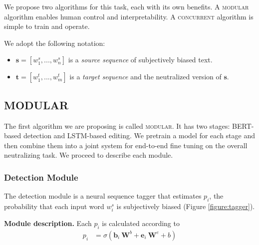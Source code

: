 We propose two algorithms for this task, each with its own benefits.  A \textsc{modular} algorithm enables human control and interpretability. A \textsc{concurrent} algorithm is simple to train and operate. 


We adopt the following notation:
\vspace*{-5pt}\begin{itemize}
    \item $\mathbf{s} = [w^s_1, ..., w^s_n]$ is a \emph{source sequence} of subjectively biased text. \vspace*{-4pt}
    \item $\mathbf{t} = [w^t_1, ..., w^t_m]$ is a \emph{target sequence} and the neutralized version of $\mathbf{s}$.
\end{itemize}

\subsection{MODULAR}
The first algorithm we are proposing is called \textsc{modular}. It has two stages: BERT-based detection and LSTM-based editing. We pretrain a model for each stage and then combine them into a joint system for end-to-end fine tuning on the overall neutralizing task. We proceed to describe each module.  

\subsubsection{Detection Module}  The detection module is a neural sequence tagger that estimates $p_i$, the probability that each input word $w^s_i$ is subjectively biased (Figure \ref{figure:tagger}). 
\label{subsection:tagger}

\textbf{Module description.} Each $p_i$ is calculated according to 
\begin{align}
    \label{equation:tagger}
    p_i &= \sigma( \mathbf{b}_i\ \mathbf{W}^{b} + \mathbf{e}_i\ \mathbf{W}^{e} + b)
\end{align}

